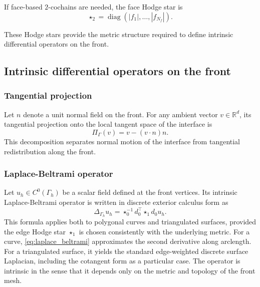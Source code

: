 \documentclass{article}
\begin{document}
If face-based $2$-cochains are needed, the face Hodge star is
\begin{equation}
\star_2 = \operatorname{diag}\!\left(|f_1|,\ldots,|f_{N_f}|\right).
\label{eq:hodge2_surface}
\end{equation}

These Hodge stars provide the metric structure required to define intrinsic
differential operators on the front.

\subsection{Intrinsic differential operators on the front}
\label{subsec:front_operators}

\subsubsection{Tangential projection}

Let $n$ denote a unit normal field on the front.
For any ambient vector $v\in\mathbb{R}^d$, its tangential projection onto the
local tangent space of the interface is
\begin{equation}
\Pi_\Gamma(v) = v - (v\cdot n)n.
\label{eq:tangential_projection}
\end{equation}
This decomposition separates normal motion of the interface from tangential
redistribution along the front.

\subsubsection{Laplace-Beltrami operator}

Let $u_h\in C^0(\Gamma_h)$ be a scalar field defined at the front vertices.
Its intrinsic Laplace-Beltrami operator is written in discrete exterior calculus form as
\begin{equation}
\Delta_{\Gamma_h} u_h
=
\star_0^{-1} d_0^\top \star_1 d_0 u_h.
\label{eq:laplace_beltrami}
\end{equation}
This formula applies both to polygonal curves and triangulated surfaces, provided
the edge Hodge star $\star_1$ is chosen consistently with the underlying metric.
For a curve, \eqref{eq:laplace_beltrami} approximates the second derivative along arclength.
For a triangulated surface, it yields the standard edge-weighted discrete surface
Laplacian, including the cotangent form as a particular case.
The operator is intrinsic in the sense that it depends only on the metric and
topology of the front mesh.
\end{document}
